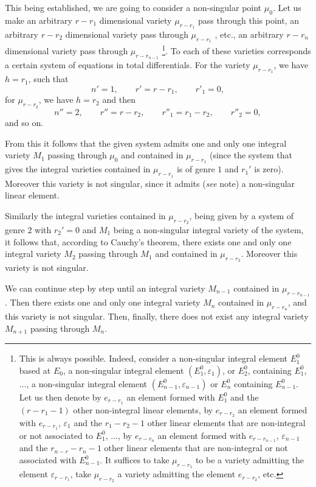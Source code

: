 \documentclass[leqno,11pt]{book}
\makeatletter
\theoremstyle{shape1}
\theoremstyle{shapesmall}
\let\old@epsilon\epsilon
\let\old@varepsilon\varepsilon
\let\epsilon\old@varepsilon
\let\varepsilon\old@epsilon
\makeatother
\begin{document}
This being established, we are going to consider a non-singular point $\mu_{0}$. Let us make an arbitrary $r-r_{1}$ dimensional variety $\mu_{r-r_{1}}$ pass through this point, an arbitrary $r-r_{2}$ dimensional variety pass through $\mu_{r-r_{1}}$ , etc., an arbitrary $r-r_{n}$ dimensional variety pass through $\mu_{r-r_{n-1}}$ \footnote{This is always possible. Indeed, consider a non-singular integral element $E_{1}^{0}$ based at $E_{0}$, a non-singular integral element $(E_{1}^{0},\epsilon_{1})$, or $E_{2}^{0}$, containing $E_{1}^{0}$, $\dots$, a non-singular integral element $(E^{0}_{n-1},\epsilon_{n-1})$ or $E^{0}_{n}$ containing $E^{0}_{n-1}$. Let us then denote by $e_{r-r_{1}}$ an element formed with $E_{1}^{0}$ and the $(r-r_{1}-1)$ other non-integral linear elements, by $e_{r-r_{2}}$ an element formed with $e_{r-r_{1}}$, $\epsilon_{1}$ and the $r_{1}-r_{2}-1$ other linear elements that are non-integral or not associated to $E_{1}^{0}$, $\dots$, by $e_{r-r_{n}}$ an element formed with $e_{r-r_{n-1}}$, $\epsilon_{n-1}$ and the $r_{n-r}-r_{n}-1$ other linear elements that are non-integral or not associated with $E_{n-1}^{0}$. It suffices to take $\mu_{r-r_{1}}$ to be a variety admitting the element $\epsilon_{r-r_{1}}$, take $\mu_{r-r_{2}}$ a variety admitting the element $e_{r-r_{2}}$, etc.}. To each of these varieties corresponds a certain system of equations in total differentials. For the variety $\mu_{r-r_{1}}$, we have $h=r_{1}$, such that
\[
n'=1,\qquad r'=r-r_{1},\qquad r'_{1}=0,
\]
for $\mu_{r-r_{2}}$, we have $h=r_{2}$ and then
\[
n''=2,\qquad r''=r-r_{2},\qquad r''_{1}=r_{1}-r_{2},\qquad r''_{2}=0,
\]
and so on.

From this it follows that the given system admits one and only one integral variety $M_{1}$ passing through $\mu_{0}$ and contained in $\mu_{r-r_{1}}$ (since the system that gives the integral varieties contained in $\mu_{r-r_{1}}$ is of genre $1$ and $r_{1}'$ is zero). Moreover this variety is not singular, since it admits (\emph{see} note) a non-singular linear element.

Similarly the integral varieties contained in $\mu_{r-r_{2}}$, being given by a system of genre $2$ with $r_{2}'=0$ and $M_{1}$ being a non-singular integral variety of the system, it follows that, according to Cauchy's theorem, there exists one and only one integral variety $M_{2}$ passing through $M_{1}$ and contained in $\mu_{r-r_{2}}$. Moreover this variety is not singular.

We can continue step by step until an integral variety $M_{n-1}$ contained in $\mu_{r-r_{n-1}}$. Then there exists one and only one integral variety $M_{n}$ contained in $\mu_{r-r_{n}}$, and this variety is not singular. Then, finally, there does not exist any integral variety $M_{n+1}$ passing through $M_{n}$.
\end{document}
